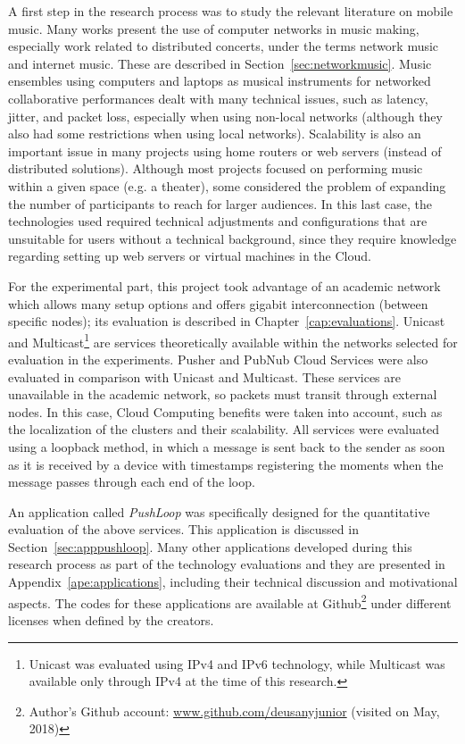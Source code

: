 A first step in the research process was to study the relevant literature on mobile music.
Many works present the use of computer networks in music making, especially work related to distributed concerts, under the terms network music and internet music.
These are described in Section~\ref{sec:networkmusic}.
Music ensembles using computers and laptops as musical instruments for networked collaborative performances dealt with many technical issues, such as latency, jitter, and packet loss, especially when using non-local networks (although they also had some restrictions when using local networks).
Scalability is also an important issue in many projects using home routers or web servers (instead of distributed solutions).
Although most projects focused on performing music within a given space (e.g. a theater), some considered the problem of expanding the number of participants to reach for larger audiences.
In this last case, the technologies used required technical adjustments and configurations that are unsuitable for users without a technical background, since they require knowledge regarding setting up web servers or virtual machines in the Cloud.

For the experimental part, this project took advantage of an academic network which allows many setup options and offers gigabit interconnection (between specific nodes); its evaluation is described in Chapter~\ref{cap:evaluations}.
Unicast and Multicast\footnote{Unicast was evaluated using IPv4 and IPv6 technology, while Multicast was available only through IPv4 at the time of this research.} are services theoretically available within the networks selected for evaluation in the experiments.
Pusher and PubNub Cloud Services were also evaluated in comparison with Unicast and Multicast.
These services are unavailable in the academic network, so packets must transit through external nodes.
In this case, Cloud Computing benefits were taken into account, such as the localization of the clusters and their scalability.
All services were evaluated using a loopback method, in which a message is sent back to the sender as soon as it is received by a device with timestamps registering the moments when the message passes through each end of the loop.

An application called \textit{PushLoop} was specifically designed for the quantitative evaluation of the above services.
This application is discussed in Section~\ref{sec:apppushloop}.
Many other applications developed during this research process as part of the technology evaluations and they are presented in Appendix~\ref{ape:applications}, including their technical discussion and motivational aspects.
The codes for these applications are available at Github\footnote{Author's Github account: \url{www.github.com/deusanyjunior} (visited on May, 2018)} under different licenses when defined by the creators.

